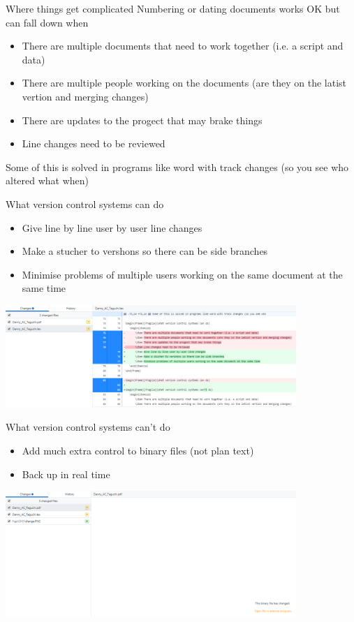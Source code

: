 \documentclass[10pt]{beamer}
\begin{document}
\begin{frame}[fragile]{Where things get complicated}
Numbering or dating documents works OK but can fall down when\\
	\begin{itemize}
		\item There are multiple documents that need to work together (i.e. a script and data)
		\item There are multiple people working on the documents (are they on the latist vertion and merging changes)
		\item There are updates to the progect that may brake things
		\item Line changes need to be reviewed
	\end{itemize}

Some of this is solved in programs like word with track changes (so you see who altered what when)
\end{frame}


\begin{frame}[fragile]{What version control systems can do}
	\begin{itemize}
		\item Give line by line user by user line changes
		\item Make a stucher to vershons so there can be side branches
		\item Minimise problems of multiple users working on the same document at the same time
	\end{itemize}
	\includegraphics[width=11cm]{Figs/GHD/change}
\end{frame}


\begin{frame}[fragile]{What version control systems can't do}
	\begin{itemize}
		\item Add much extra control to binary files (not plan text)
		\item Back up in real time
	\end{itemize}
	\includegraphics[width=11cm]{Figs/GHD/binarychange}
\end{frame}
\end{document}
